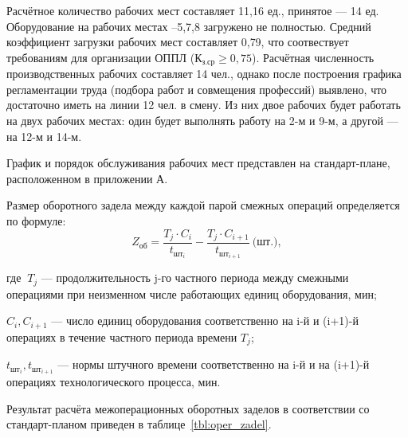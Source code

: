 Расчётное количество рабочих мест составляет 11{,}16 ед.,
принятое --- 14 ед.
Оборудование на рабочих местах \textnumero {}--5,7,8 
загружено не полностью.
Средний коэффициент загрузки рабочих мест составляет 0{,}79, что соотвествует
требованиям для организации ОППЛ (\( \text{К}_{\text{з.ср}} \ge 0{,}75 \)).
Расчётная численность производственных рабочих составляет 14 чел.,
однако после построения графика регламентации труда
(подбора работ и совмещения профессий) выявлено, что достаточно
иметь на линии 12 чел. в смену.
Из них двое рабочих будет работать на двух рабочих местах:
один будет выполнять работу на 2-м и 9-м, а другой --- на 12-м и 14-м.

График и порядок обслуживания рабочих мест представлен на стандарт-плане,
расположенном в приложении А.

Размер оборотного задела между каждой парой смежных операций определяется 
по формуле:
\begin{equation*}
  Z_{\text{об}} = 
  \dfrac{T_j \cdot C_i}{t_{\text{шт}_i}} - \dfrac{T_j \cdot C_{i+1}}{t_{\text{шт}_{i+1}}} 
  \: \text{(шт.)},
\end{equation*}

\noindent где \( \: T_j \) --- продолжительность j-го частного периода между
смежными операциями при неизменном числе работающих единиц оборудования, мин;

\( C_i, C_{i+1} \) --- число единиц оборудования соответственно на i-й и 
(i+1)-й операциях в течение частного периода времени \( T_j \);

\( t_{\text{шт}_i}, t_{\text{шт}_{i+1}}\) --- нормы штучного времени соответственно на
i-й и на (i+1)-й операциях технологического процесса, мин.

Результат расчёта межоперационных оборотных заделов в соответствии со 
стандарт-планом приведен в таблице~\ref{tbl:oper_zadel}.

